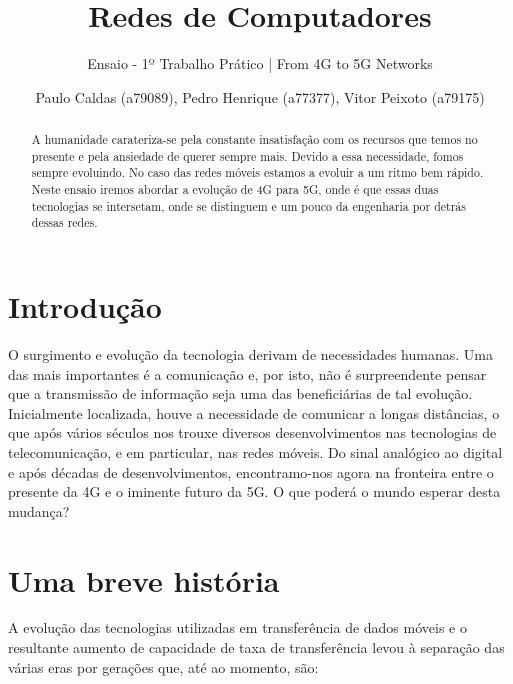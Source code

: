 \documentclass{llncs}
\begin{document}
\title{Redes de Computadores}
\subtitle{Ensaio - 1º Trabalho Prático | From 4G to 5G Networks}

\author{Paulo Caldas (a79089), Pedro Henrique (a77377), Vitor Peixoto (a79175)}




\maketitle              %

\begin{abstract}

    A humanidade carateriza-se pela constante insatisfação com os recursos que temos no presente e pela ansiedade de querer sempre mais. Devido a essa necessidade, fomos sempre evoluindo. No caso das redes móveis estamos a evoluir a um ritmo bem rápido. Neste ensaio iremos abordar a evolução de 4G para 5G, onde é que essas duas tecnologias se intersetam, onde se distinguem e um pouco da engenharia por detrás dessas redes.

\end{abstract}

\section{Introdução}

O surgimento e evolução da tecnologia derivam de necessidades humanas. Uma das mais importantes é a comunicação e, por isto, não é surpreendente pensar que a transmissão de informação seja uma das beneficiárias de tal evolução. Inicialmente localizada, houve a necessidade de comunicar a longas distâncias, o que após vários séculos nos trouxe diversos desenvolvimentos nas tecnologias de telecomunicação, e em particular, nas redes móveis. Do sinal analógico ao digital e após décadas de desenvolvimentos, encontramo-nos agora na fronteira entre o presente da 4G e o iminente futuro da 5G. O que poderá o mundo esperar desta mudança?

\section{Uma breve história}
\hspace*{ 1.5em}A evolução das tecnologias utilizadas em transferência de dados móveis e o resultante aumento de capacidade de taxa de transferência levou à separação das várias eras por gerações que, até ao momento, são:
\end{document}
